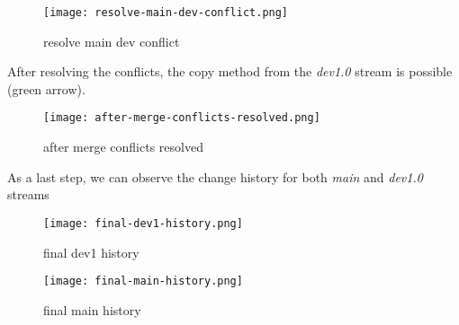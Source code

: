 \begin{figure}[H]
    \centering
    \texttt{[image: resolve-main-dev-conflict.png]}
    \setlength{\belowcaptionskip}{-10pt}
    \caption{resolve main dev conflict}
    \label{fig:resolve-main-dev-conflict}
\end{figure}

After resolving the conflicts, the copy method from the \textit{dev1.0} stream is possible (green arrow).
\begin{figure}[H]
    \centering
    \texttt{[image: after-merge-conflicts-resolved.png]}
    \setlength{\belowcaptionskip}{-20pt}
    \caption{after merge conflicts resolved}
    \label{fig:after-merge-conflicts-resolved}
\end{figure}
As a last step, we can observe the change history for both \textit{main} and \textit{dev1.0} streams 
\begin{figure}[H]
    \centering
    \texttt{[image: final-dev1-history.png]}
    \setlength{\belowcaptionskip}{-20pt}
    \caption{final dev1 history}
    \label{fig:final-dev1-history}
\end{figure}

\begin{figure}[H]
    \centering
    \texttt{[image: final-main-history.png]}
    \setlength{\belowcaptionskip}{-10pt}
    \caption{final main history}
    \label{fig:final-main-history}
\end{figure}